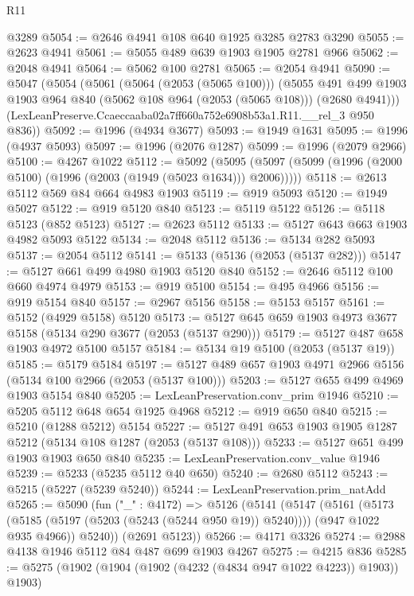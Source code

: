 \begin{lexlean}{R11}
\begin{coremodule}
    @3289
@5054 := @2646 @4941 @108 @640 @1925 @3285 @2783 @3290
@5055 := @2623 @4941
@5061 := @5055 @489 @639 @1903 @1905 @2781 @966
@5062 := @2048 @4941
@5064 := @5062 @100 @2781
@5065 := @2054 @4941
@5090 := @5047
    (@5054
      (@5061
        (@5064 (@2053 (@5065 @100)))
        (@5055
          @491
          @499
          @1903
          @1903
          @964
          @840
          (@5062 @108 @964 (@2053 (@5065 @108)))
          (@2680 @4941)))
      (LexLeanPreserve.Ccaeccaaba02a7ff660a752e6908b53a1.R11.__rel_3 @950 @836))
@5092 := @1996 (@4934 @3677)
@5093 := @1949 @1631
@5095 := @1996 (@4937 @5093)
@5097 := @1996 (@2076 @1287)
@5099 := @1996 (@2079 @2966)
@5100 := @4267 @1022
@5112 := @5092
    (@5095 (@5097 (@5099 (@1996 (@2000 @5100) (@1996 (@2003 (@1949 (@5023 @1634))) @2006)))))
@5118 := @2613 @5112 @569 @84 @664 @4983 @1903
@5119 := @919 @5093
@5120 := @1949 @5027
@5122 := @919 @5120 @840
@5123 := @5119 @5122
@5126 := @5118 @5123 (@852 @5123)
@5127 := @2623 @5112
@5133 := @5127 @643 @663 @1903 @4982 @5093 @5122
@5134 := @2048 @5112
@5136 := @5134 @282 @5093
@5137 := @2054 @5112
@5141 := @5133 (@5136 (@2053 (@5137 @282)))
@5147 := @5127 @661 @499 @4980 @1903 @5120 @840
@5152 := @2646 @5112 @100 @660 @4974 @4979
@5153 := @919 @5100
@5154 := @495 @4966
@5156 := @919 @5154 @840
@5157 := @2967 @5156
@5158 := @5153 @5157
@5161 := @5152 (@4929 @5158) @5120
@5173 := @5127 @645 @659 @1903 @4973 @3677 @5158 (@5134 @290 @3677 (@2053 (@5137 @290)))
@5179 := @5127 @487 @658 @1903 @4972 @5100 @5157
@5184 := @5134 @19 @5100 (@2053 (@5137 @19))
@5185 := @5179 @5184
@5197 := @5127 @489 @657 @1903 @4971 @2966 @5156 (@5134 @100 @2966 (@2053 (@5137 @100)))
@5203 := @5127 @655 @499 @4969 @1903 @5154 @840
@5205 := LexLeanPreservation.conv_prim @1946
@5210 := @5205 @5112 @648 @654 @1925 @4968
@5212 := @919 @650 @840
@5215 := @5210 (@1288 @5212) @5154
@5227 := @5127 @491 @653 @1903 @1905 @1287 @5212 (@5134 @108 @1287 (@2053 (@5137 @108)))
@5233 := @5127 @651 @499 @1903 @1903 @650 @840
@5235 := LexLeanPreservation.conv_value @1946
@5239 := @5233 (@5235 @5112 @40 @650)
@5240 := @2680 @5112
@5243 := @5215 (@5227 (@5239 @5240))
@5244 := LexLeanPreservation.prim_natAdd
@5265 := @5090
    (fun ("_" : @4172) =>
    @5126
      (@5141
        (@5147
          (@5161
            (@5173 (@5185 (@5197 (@5203 (@5243 (@5244 @950 @19)) @5240))))
            (@947 @1022 @935 @4966))
          @5240))
      (@2691 @5123))
@5266 := @4171 @3326
@5274 := @2988 @4138 @1946 @5112 @84 @487 @699 @1903 @4267
@5275 := @4215 @836
@5285 := @5275 (@1902 (@1904 (@1902 (@4232 (@4834 @947 @1022 @4223)) @1903)) @1903)

\end{coremodule}
\end{lexlean}
